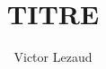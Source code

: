 \documentclass[10pt,a4paper,twoside]{article}
\author{Victor Lezaud}
\title{TITRE}
\begin{document}
\maketitle
\renewcommand{\contentsname}{Sommaire}
\tableofcontents

\newpage
\end{document}
